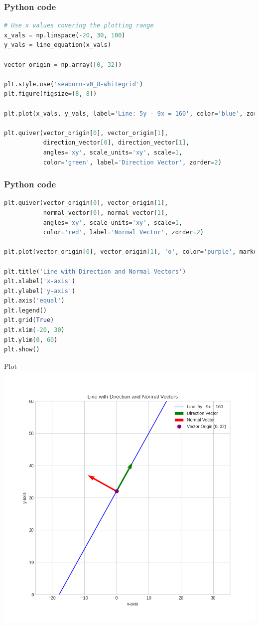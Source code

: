 \documentclass{beamer}
\begin{document}
\begin{frame}[fragile]
    \frametitle{Python code}

    \begin{lstlisting}[language=Python]
# Use x values covering the plotting range
x_vals = np.linspace(-20, 30, 100)
y_vals = line_equation(x_vals)

vector_origin = np.array([0, 32])

plt.style.use('seaborn-v0_8-whitegrid')
plt.figure(figsize=(8, 8))

plt.plot(x_vals, y_vals, label='Line: 5y - 9x = 160', color='blue', zorder=1)

plt.quiver(vector_origin[0], vector_origin[1],
           direction_vector[0], direction_vector[1],
           angles='xy', scale_units='xy', scale=1,
           color='green', label='Direction Vector', zorder=2)
           \end{lstlisting}
\end{frame}
\begin{frame}[fragile]
    \frametitle{Python code}

    \begin{lstlisting}[language=Python]
plt.quiver(vector_origin[0], vector_origin[1],
           normal_vector[0], normal_vector[1],
           angles='xy', scale_units='xy', scale=1,
           color='red', label='Normal Vector', zorder=2)

plt.plot(vector_origin[0], vector_origin[1], 'o', color='purple', markersize=8, label='Vector Origin (0, 32)')

plt.title('Line with Direction and Normal Vectors')
plt.xlabel('x-axis')
plt.ylabel('y-axis')
plt.axis('equal')
plt.legend()
plt.grid(True)
plt.xlim(-20, 30)
plt.ylim(0, 60)
plt.show() 
    \end{lstlisting}
\end{frame}

\begin{frame}{Plot}
    \centering
    \includegraphics[width=3\columnwidth, height=0.8\textheight, keepaspectratio]{figs/fig.png}     
\end{frame}
\end{document}

